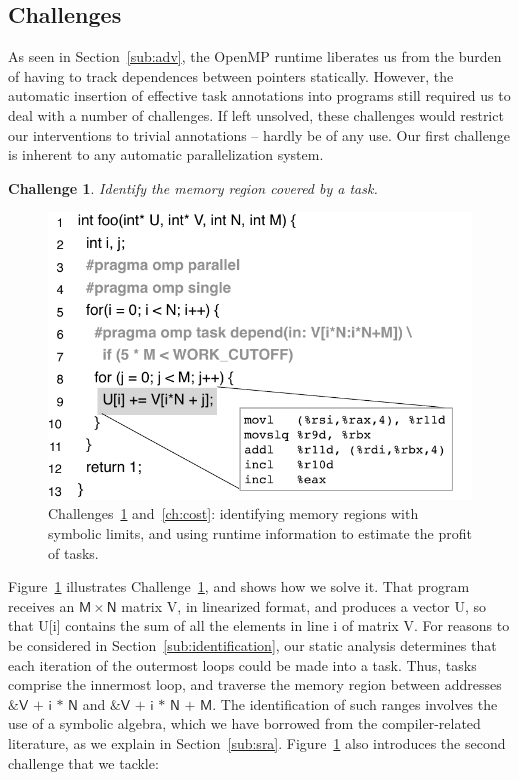 \documentclass[sigplan,10pt,review,anonymous]{acmart}
\newtheorem{Challenge}{Challenge}[section]
\begin{document}
\subsection{Challenges}
\label{sub:dif}

As seen in Section~\ref{sub:adv}, the OpenMP runtime liberates us
from the burden of having to track dependences between pointers statically.
However, the automatic insertion of effective task annotations into
programs still required us to deal with a number of challenges.
If left unsolved, these challenges would restrict our interventions
to trivial annotations -- hardly be of any use.
Our first challenge is inherent to any automatic parallelization system.

\begin{Challenge}
\label{ch:Regions}
Identify the memory region covered by a task.
\end{Challenge}

\begin{figure}[b!]
\begin{center}
\includegraphics[width=1\columnwidth]{images/ex_Regions}
\caption{Challenges~\ref{ch:Regions} and~\ref{ch:cost}: identifying memory regions
with symbolic limits, and using runtime information to estimate the profit of
tasks.}
\label{fig:ex_Regions}
\end{center}
\end{figure}

Figure~\ref{fig:ex_Regions} illustrates Challenge~\ref{ch:Regions}, and shows
how we solve it.
That program receives an $\mathsf{M}\times\mathsf{N}$ matrix \textsf{V}, in
linearized format, and produces a vector \textsf{U}, so that \textsf{U[i]}
contains the sum of all the elements in line \textsf{i} of matrix \textsf{V}.
For reasons to be considered in Section~\ref{sub:identification},
our static analysis determines that each iteration of the outermost loops
could be made into a task.
Thus, tasks comprise the innermost loop, and traverse the memory region
between addresses $\textsf{\&V + i * N}$ and $\textsf{\&V + i * N + M}$.
The identification of such ranges involves the use of a symbolic algebra,
which we have borrowed from the compiler-related literature, as we
explain in Section~\ref{sub:sra}.
Figure~\ref{fig:ex_Regions} also introduces the second challenge that we
tackle:
\end{document}
